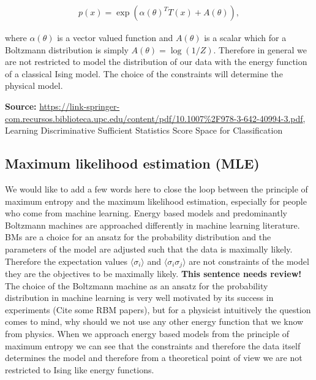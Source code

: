 \documentclass[nofootinbib, superscriptaddress, prl]{revtex4}
\begin{document}
\begin{align}
	p(x) = \exp \left( \alpha(\theta)^T T(x) + A(\theta) \right),
\end{align}

where $\alpha(\theta)$ is a vector valued function and $A(\theta)$ is a scalar which for a Boltzmann distribution is simply $A(\theta) = \log(1/Z)$. Therefore in general we are not restricted to model the distribution of our data with the energy function of a classical Ising model. The choice of the constraints will determine the physical model.

\textbf{Source:}
\url{https://link-springer-com.recursos.biblioteca.upc.edu/content/pdf/10.1007%2F978-3-642-40994-3.pdf}, Learning Discriminative Sufficient Statistics
Score Space for Classification

\noindent{}

\subsection{Maximum likelihood estimation (MLE)}

We would like to add a few words here to close the loop between the principle of maximum entropy and the maximum likelihood estimation, especially for people who come from machine learning.
Energy based models and predominantly Boltzmann machines are approached differently in machine learning literature. BMs are a choice for an ansatz for the probability distribution and the parameters of the model are adjusted such that the data is maximally likely. Therefore the expectation values $\langle \sigma_i \rangle$ and  $\langle \sigma_i \sigma_j \rangle$ are not constraints of the model they are the objectives to be maximally likely. \textbf{This sentence needs review!}
The choice of the Boltzmann machine as an ansatz for the probability distribution in machine learning is very well motivated by its success in experiments (Cite some RBM papers), but for a physicist intuitively the question comes to mind, why should we not use any other energy function that we know from physics. When we approach energy based models from the principle of maximum entropy we can see that the constraints and therefore the data itself determines the model and therefore from a theoretical point of view we are not restricted to Ising like energy functions.
\end{document}
